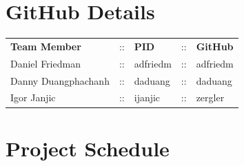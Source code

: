 \section{GitHub Details}
\begin{tabular}{ l c l c l}
    \textbf{Team Member} & :: & \textbf{PID} & :: & \textbf{GitHub} \\
    Daniel Friedman      & :: & adfriedm     & :: & adfriedm        \\
    Danny Duangphachanh  & :: & daduang      & :: & daduang         \\
    Igor Janjic          & :: & ijanjic      & :: & zergler
\end{tabular}

\section{Project Schedule}


